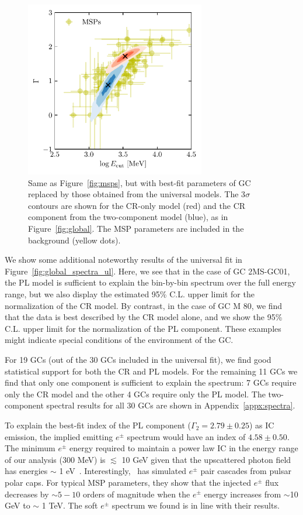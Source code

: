 \documentclass[doublespace,nopageskip]{VTthesis} %
\begin{document}
\begin{figure}[htb]
    \centering
    \includegraphics[width=0.7\textwidth]{Figures/Globular/msp_vs_gc_global.pdf}
    \caption{Same as Figure~\ref{fig:msps}, but with best-fit parameters of GC replaced by those obtained from the universal models. The 3$\sigma$ contours are shown for the CR-only model (red) and the CR component from the two-component model (blue), as in Figure~\ref{fig:global}. The MSP parameters are included in the background (yellow dots).}
    \label{fig:msps_global}
\end{figure}

We show some additional noteworthy results of the universal fit in Figure~\ref{fig:global_spectra_ul}. Here, we see that in the case of GC 2MS-GC01, the {PL} model is sufficient to explain the bin-by-bin spectrum over the full energy range, but we also display the estimated 95\% C.L. upper limit for the normalization of the CR model. By contrast, in the case of GC M 80, we find that the data is best described by the CR model alone, and we show the 95\% C.L. upper limit for the normalization of the {PL} component. These examples might indicate special conditions of the environment of the GC.

For 19 GCs (out of the 30 GCs included in the universal fit), we find good statistical support for both the CR and {PL} models. For the remaining 11 GCs we find that only one component is sufficient to explain the spectrum: 7 GCs require only the CR model and the other 4 GCs require only the {PL} model. The two-component spectral results for all 30 GCs are shown in Appendix~\ref{appx:spectra}.

To explain the best-fit index of the {PL} component ($\Gamma_2 = 2.79 \pm 0.25$) {as IC emission}, the implied emitting $e^\pm$ spectrum would have an index of $4.58 \pm 0.50$. The minimum $e^\pm$ energy required to maintain a power law IC in the energy range of our analysis (300 MeV) is $\lesssim$ 10 GeV given that the upscattered photon field has energies $\sim$ 1 eV~\citep{1970RvMP...42..237B}. Interestingly,~\citet{2011ApJ...743..181H} has simulated $e^{\pm}$ pair cascades from pulsar polar caps. For typical MSP parameters, they show that the injected $e^\pm$ flux decreases by $\sim 5 - 10$ orders of magnitude when the $e^\pm$ energy increases from $\sim$10 GeV to $\sim$ 1 TeV. The soft $e^\pm$ spectrum we found is in line with their results.
\end{document}
